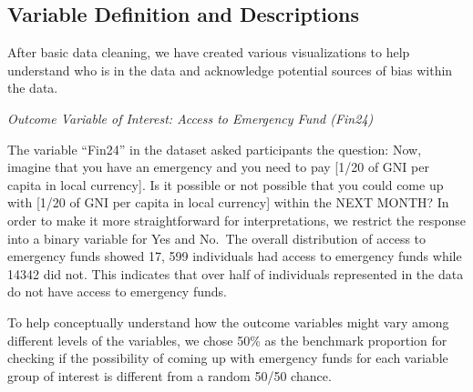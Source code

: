 \documentclass[12pt]{article}
\begin{document}
\hypertarget{variable-definition-and-descriptions}{%
\subsection{Variable Definition and
Descriptions}\label{variable-definition-and-descriptions}}

After basic data cleaning, we have created various visualizations to
help understand who is in the data and acknowledge potential sources of
bias within the data.

\emph{Outcome Variable of Interest: Access to Emergency Fund (Fin24)}

The variable ``Fin24'' in the dataset asked participants the question:
Now, imagine that you have an emergency and you need to pay {[}1/20 of
GNI per capita in local currency{]}. Is it possible or not possible that
you could come up with {[}1/20 of GNI per capita in local currency{]}
within the NEXT MONTH? In order to make it more straightforward for
interpretations, we restrict the response into a binary variable for Yes
and No.~The overall distribution of access to emergency funds showed 17,
599 individuals had access to emergency funds while 14342 did not. This
indicates that over half of individuals represented in the data do not
have access to emergency funds.

To help conceptually understand how the outcome variables might vary
among different levels of the variables, we chose 50\% as the benchmark
proportion for checking if the possibility of coming up with emergency
funds for each variable group of interest is different from a random
50/50 chance.



\end{document}
